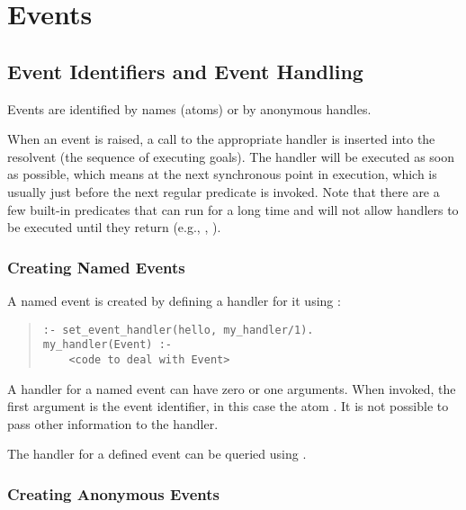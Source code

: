 \section{Events}

\subsection{Event Identifiers and Event Handling}

Events are identified by names (atoms) or by anonymous handles.

When an event is raised, a call to the appropriate handler is inserted
into the resolvent (the sequence of executing goals).
The handler will be executed as soon as possible, which means at the
next synchronous point in execution, which is usually just before the
next regular predicate is invoked. Note that there are a few
built-in predicates that can run for a long time and will not allow
handlers to be executed until they return (e.g., ,
).


\subsubsection{Creating Named Events}

A named event is created by defining a handler for it using
:
\begin{quote}
\begin{verbatim}
:- set_event_handler(hello, my_handler/1).
my_handler(Event) :-
    <code to deal with Event>
\end{verbatim}
\end{quote}
A handler for a named event can have zero or one arguments. When invoked,
the first argument is the event identifier, in this case the atom
.
It is not possible to pass other information to the handler.

The handler for a defined event can be queried using
.


\subsubsection{Creating Anonymous Events}

